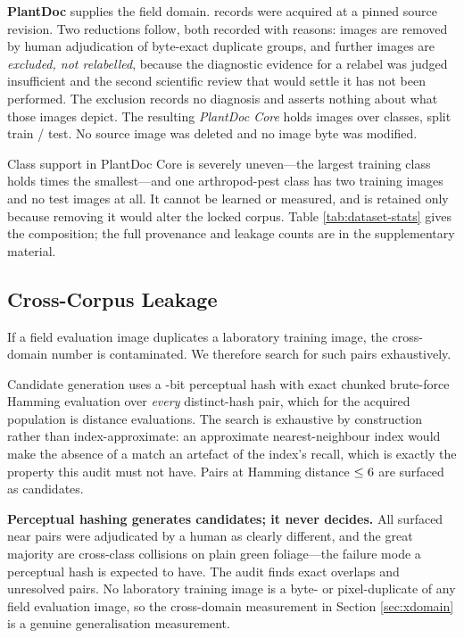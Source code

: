 \documentclass[runningheads]{llncs}
\begin{document}
\textbf{PlantDoc} \cite{singh2020plantdoc} supplies the field domain.
\NPdcAcquired{} records were acquired at a pinned source revision. Two
reductions follow, both recorded with reasons:
\NPdcExcludedDup{} images are removed by human adjudication of byte-exact
duplicate groups, and \NPdcExcludedReview{} further images are \emph{excluded,
not relabelled}, because the diagnostic evidence for a relabel was judged
insufficient and the second scientific review that would settle it has not been
performed. The exclusion records no diagnosis and asserts nothing about what
those images depict. The resulting \emph{PlantDoc Core} holds \NPdc{} images
over \NPdcClasses{} classes, split \NPdcTrain{} train / \NPdcTest{} test. No
source image was deleted and no image byte was modified.

Class support in PlantDoc Core is severely uneven---the largest training class
holds \PdcImbalance{} times the smallest---and one arthropod-pest class has two training
images and no test images at all. It cannot be learned or measured, and is
retained only because removing it would alter the locked corpus. Table
\ref{tab:dataset-stats} gives the composition; the full provenance and leakage
counts are in the supplementary material.



\subsection{Cross-Corpus Leakage}

If a field evaluation image duplicates a laboratory training image, the
cross-domain number is contaminated. We therefore search for such pairs
exhaustively.

Candidate generation uses a \PhashBits{}-bit perceptual hash with exact chunked
brute-force Hamming evaluation over \emph{every} distinct-hash pair, which for
the acquired population is \NPhashComparisonsSci{} distance evaluations. The search
is exhaustive by construction rather than index-approximate: an approximate
nearest-neighbour index would make the absence of a match an artefact of the
index's recall, which is exactly the property this audit must not have. Pairs at
Hamming distance $\leq 6{}$ are surfaced as candidates.

\textbf{Perceptual hashing generates candidates; it never decides.} All
\NLeakNearCore{} surfaced near pairs were adjudicated by a human as clearly
different, and the great majority are cross-class collisions on plain green
foliage---the failure mode a perceptual hash is expected to have. The audit
finds \NLeakExactCore{} exact overlaps and \NLeakUnresolved{} unresolved pairs.
No laboratory training image is a byte- or pixel-duplicate of any field
evaluation image, so the cross-domain measurement in Section \ref{sec:xdomain}
is a genuine generalisation measurement.
\end{document}
